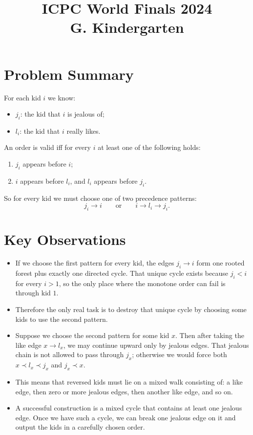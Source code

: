 \documentclass[11pt]{article}
\title{ICPC World Finals 2024\\G. Kindergarten}
\author{}
\date{}
\begin{document}
\maketitle

\section*{Problem Summary}

For each kid $i$ we know:
\begin{itemize}[leftmargin=*]
    \item $j_i$: the kid that $i$ is jealous of;
    \item $l_i$: the kid that $i$ really likes.
\end{itemize}

An order is valid iff for every $i$ at least one of the following holds:
\begin{enumerate}[leftmargin=*]
    \item $j_i$ appears before $i$;
    \item $i$ appears before $l_i$, and $l_i$ appears before $j_i$.
\end{enumerate}

So for every kid we must choose one of two precedence patterns:
\[
j_i \to i
\qquad\text{or}\qquad
i \to l_i \to j_i.
\]

\section*{Key Observations}

\begin{itemize}[leftmargin=*]
    \item If we choose the first pattern for every kid, the edges $j_i \to i$ form one rooted forest plus exactly one directed cycle. That unique cycle exists because $j_i < i$ for every $i > 1$, so the only place where the monotone order can fail is through kid $1$.
    \item Therefore the only real task is to destroy that unique cycle by choosing some kids to use the second pattern.
    \item Suppose we choose the second pattern for some kid $x$. Then after taking the like edge $x \to l_x$, we may continue upward only by jealous edges. That jealous chain is not allowed to pass through $j_x$; otherwise we would force both $x \prec l_x \prec j_x$ and $j_x \prec x$.
    \item This means that reversed kids must lie on a mixed walk consisting of:
    a like edge, then zero or more jealous edges, then another like edge, and so on.
    \item A successful construction is a mixed cycle that contains at least one jealous edge. Once we have such a cycle, we can break one jealous edge on it and output the kids in a carefully chosen order.
\end{itemize}
\end{document}
